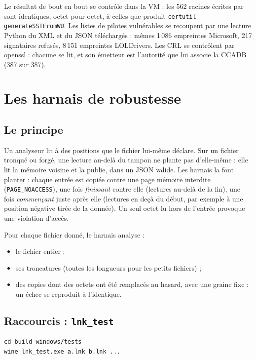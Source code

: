 \documentclass[11pt,a4paper,oneside]{report}
\begin{document}
Le résultat de bout en bout se contrôle dans la VM : les 562 racines écrites par
 sont identiques, octet pour octet, à celles que produit
\texttt{certutil -generateSSTFromWU}. Les listes de pilotes vulnérables se
recoupent par une lecture Python du XML et du JSON téléchargés : mêmes
1\,086 empreintes Microsoft, 217 signataires refusés, 8\,151 empreintes
LOLDrivers. Les CRL se contrôlent par openssl : chacune se lit, et son
émetteur est l'autorité que lui associe la CCADB (387 sur 387).

\chapter{Les harnais de robustesse}\label{ch:robustesse}

\section{Le principe}

Un analyseur lit à des positions que le fichier lui-même déclare. Sur un
fichier tronqué ou forgé, une lecture au-delà du tampon ne plante pas
d'elle-même : elle lit la mémoire voisine et la publie, dans un JSON valide.
Les harnais la font planter : chaque entrée est copiée contre une page mémoire
interdite (\texttt{PAGE\_NOACCESS}), une fois \emph{finissant} contre elle
(lectures au-delà de la fin), une fois \emph{commençant} juste après elle
(lectures en deçà du début, par exemple à une position négative tirée de la
donnée). Un seul octet lu hors de l'entrée provoque une violation d'accès.

Pour chaque fichier donné, le harnais analyse :
\begin{itemize}
  \item le fichier entier ;
  \item ses troncatures (toutes les longueurs pour les petits fichiers) ;
  \item des copies dont des octets ont été remplacés au hasard, avec une graine
    fixe : un échec se reproduit à l'identique.
\end{itemize}

\section{Raccourcis : \texttt{lnk\_test}}

\begin{lstlisting}
cd build-windows/tests
wine lnk_test.exe a.lnk b.lnk ...
\end{lstlisting}
\end{document}
